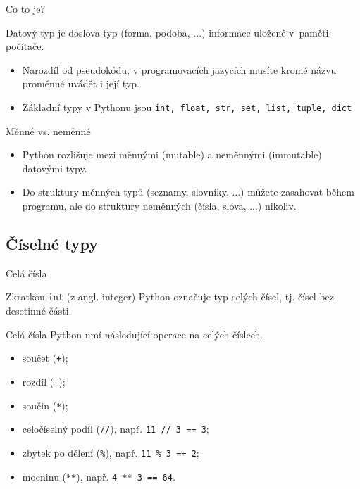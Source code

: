 \begin{frame}{Co to je?}
 \begin{tcolorbox}[title=Datový typ]
  \alert{Datový typ} je doslova typ (forma, podoba, ...) informace uložené
  v~paměti počítače.
 \end{tcolorbox}
 \pause
 \begin{itemize}
  \item<2-> Narozdíl od pseudokódu, v programovacích jazycích musíte kromě názvu
   proměnné uvádět i její typ.
  \item<3-> Základní typy v Pythonu jsou \texttt{int, float, str, set, list,
   tuple, dict}
 \end{itemize}
\end{frame}

\begin{frame}{Měnné vs. neměnné}
 \begin{itemize}
  \item<1-> Python rozlišuje mezi \alert{měnnými} (mutable) a \alert{neměnnými}
   (immutable) datovými typy.
  \item<2-> Do struktury měnných typů (seznamy, slovníky, ...) můžete zasahovat
   během programu, ale do struktury neměnných (čísla, slova, ...) nikoliv.
 \end{itemize}
\end{frame}

\subsection[Číselné typy]{Číselné typy}

\begin{frame}{Celá čísla}
 \begin{tcolorbox}[title=Datový typ \texttt{int}]
  Zkratkou \alert{\texttt{int}} (z angl. \alert{int}eger) Python označuje typ
  celých čísel, tj. čísel bez desetinné části.
 \end{tcolorbox}
\end{frame}

\begin{frame}{Celá čísla}
 Python umí následující operace na celých číslech.
 \begin{itemize}
  \item součet (\texttt{+});
  \item rozdíl (\texttt{-});
  \item součin (\texttt{*});
  \pause
  \item<2-> celočíselný podíl (\texttt{//}), např. \texttt{11 // 3 == 3};
  \item<3-> zbytek po dělení (\texttt{\%}), např. \texttt{11 \% 3 == 2};
  \item<4-> mocninu (\texttt{**}), např. \texttt{4 ** 3 == 64}.
 \end{itemize}
\end{frame}

